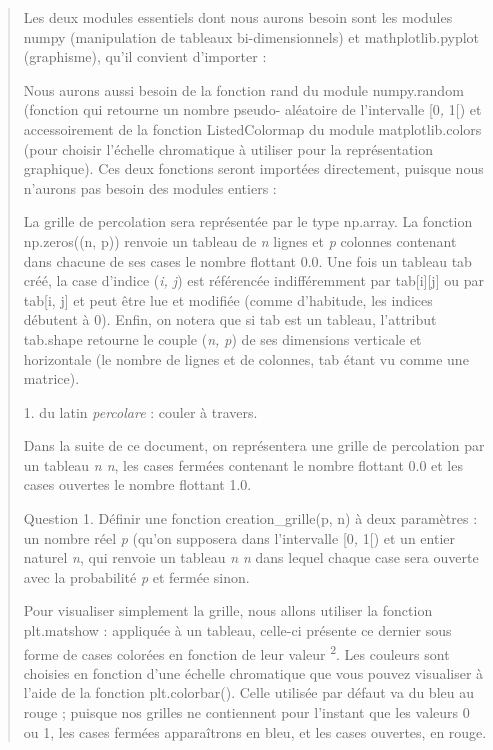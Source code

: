 \documentclass[]{article}
\begin{document}
\begin{quote}
Les deux modules essentiels dont nous aurons besoin sont les modules
numpy (manipulation de tableaux bi-dimensionnels) et mathplotlib.pyplot
(graphisme), qu'il convient d'importer :

Nous aurons aussi besoin de la fonction rand du module numpy.random
(fonction qui retourne un nombre pseudo- aléatoire de l'intervalle
{[}0\emph{,} 1{[}) et accessoirement de la fonction ListedColormap du
module matplotlib.colors (pour choisir l'échelle chromatique à utiliser
pour la représentation graphique). Ces deux fonctions seront importées
directement, puisque nous n'aurons pas besoin des modules entiers :

La grille de percolation sera représentée par le type np.array. La
fonction np.zeros((n, p)) renvoie un tableau de \emph{n} lignes et
\emph{p} colonnes contenant dans chacune de ses cases le nombre flottant
0.0. Une fois un tableau tab créé, la case d'indice (\emph{i, j}) est
référencée indifféremment par tab{[}i{]}{[}j{]} ou par tab{[}i, j{]} et
peut être lue et modifiée (comme d'habitude, les indices débutent à 0).
Enfin, on notera que si tab est un tableau, l'attribut tab.shape
retourne le couple (\emph{n, p}) de ses dimensions verticale et
horizontale (le nombre de lignes et de colonnes, tab étant vu comme une
matrice).

1. du latin \emph{percolare} : couler à travers.

Dans la suite de ce document, on représentera une grille de percolation
par un tableau \emph{n n}, les cases fermées contenant le nombre
flottant 0.0 et les cases ouvertes le nombre flottant 1.0.

Question 1. Définir une fonction creation\_grille(p, n) à deux
paramètres : un nombre réel \emph{p} (qu'on supposera dans l'intervalle
{[}0\emph{,} 1{[}) et un entier naturel \emph{n}, qui renvoie un tableau
\emph{n n} dans lequel chaque case sera ouverte avec la probabilité
\emph{p} et fermée sinon.

Pour visualiser simplement la grille, nous allons utiliser la fonction
plt.matshow : appliquée à un tableau, celle-ci présente ce dernier sous
forme de cases colorées en fonction de leur valeur \textsuperscript{2}.
Les couleurs sont choisies en fonction d'une échelle chromatique que
vous pouvez visualiser à l'aide de la fonction plt.colorbar(). Celle
utilisée par défaut va du bleu au rouge ; puisque nos grilles ne
contiennent pour l'instant que les valeurs 0 ou 1, les cases fermées
apparaîtrons en bleu, et les cases ouvertes, en rouge.


\end{quote}
\end{document}

